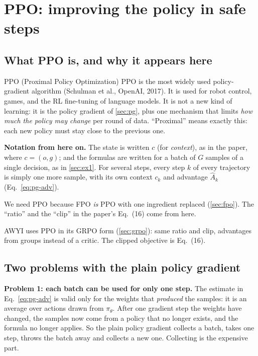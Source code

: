 \documentclass[11pt,a4paper]{article}
\newcommand{\Ah}{\hat A}
\begin{document}
\section{PPO: improving the policy in safe steps}\label{sec:ppo}

\subsection{What PPO is, and why it appears here}
\begin{newc}{PPO (Proximal Policy Optimization)}
PPO is the most widely used policy-gradient algorithm (Schulman et al., OpenAI, 2017). It is used for robot control, games, and the RL fine-tuning of language models. It is not a new kind of learning: it is the policy gradient of \cref{sec:pg}, plus one mechanism that limits \emph{how much the policy may change} per round of data. ``Proximal'' means exactly this: each new policy must stay close to the previous one.
\end{newc}
\textbf{Notation from here on.} The state is written $c$ (for \emph{context}), as in the paper, where $c=(o,g)$; and the formulas are written for a batch of $G$ samples of a single decision, as in \cref{sec:ex1}. For several steps, every step $k$ of every trajectory is simply one more sample, with its own context $c_k$ and advantage $\Ah_k$ (Eq.~\eqref{eq:pg-adv}).

We need PPO because FPO \emph{is} PPO with one ingredient replaced (\cref{sec:fpo}). The ``ratio'' and the ``clip'' in the paper's Eq.~(16) come from here.

\begin{paperlink}
AWYI uses PPO in its GRPO form (\cref{sec:grpo}): same ratio and clip, advantages from groups instead of a critic. The clipped objective is Eq.~(16).
\end{paperlink}

\subsection{Two problems with the plain policy gradient}
\textbf{Problem 1: each batch can be used for only one step.} The estimate in Eq.~\eqref{eq:pg-adv} is valid only for the weights that \emph{produced} the samples: it is an average over actions drawn from $\pi_\theta$. After one gradient step the weights have changed, the samples now come from a policy that no longer exists, and the formula no longer applies. So the plain policy gradient collects a batch, takes one step, throws the batch away and collects a new one. Collecting is the expensive part.
\end{document}
